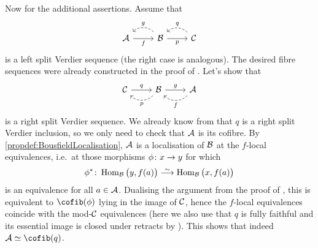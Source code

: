 \documentclass[a4paper, 10pt, oneside, DIV=9, chapterprefix=true, numbers=enddot,bibliography=totoc]{scrbook}
\begin{document}
\begin{proof*}
	Now for the additional assertions. Assume that
	\begin{equation*}
		\begin{tikzcd}
			\Aa\rar["f"'] & \Bb\rar["p"']\lar[dashed,bend right=45,"g"'] & \Cc\lar[dashed,bend right=45,"q"']
		\end{tikzcd}
	\end{equation*}
	is a left split Verdier sequence (the right case is analogous). The desired fibre sequences were already constructed in the proof of . Let's show that
	\begin{equation*}
		\begin{tikzcd}
			\Cc\rar["q"] & \Bb\rar["g"]\lar[dashed,bend left=45,"p"] & \Aa\lar[dashed,bend left=45,"f"]
		\end{tikzcd}
	\end{equation*}
	is a right split Verdier sequence. We already know from  that $q$ is a right split Verdier inclusion, so we only need to check that $\mathcal{A}$ is its cofibre. By \cref{propdef:BousfieldLocalisation}, $\mathcal{A}$ is a localisation of $\mathcal{B}$ at the $f$-local equivalences, i.e.\ at those morphisms $\phi\colon x\morphism y$ for which
	\begin{equation*}
		\phi^*\colon \Hom_\Bb\big(y,f(a)\big)\isomorphism \Hom_\Bb\big(x,f(a)\big)
	\end{equation*}
	is an equivalence for all $a\in\mathcal{A}$. Dualising the argument from the proof of , this is equivalent to $\cofib(\phi)$ lying in the image of $\mathcal{C}$, hence the $f$-local equivalences coincide with the mod-$\mathcal{C}$ equivalences (here we also use that $q$ is fully faithful and its essential image is closed under retracts by ). This shows that indeed $\Aa\simeq \cofib(q)$.
	

\end{proof*}
\end{document}
